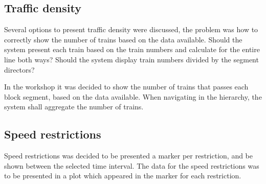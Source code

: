 \subsection{Traffic density} %
\label{sub:traffic_density}
Several options to present traffic density were discussed, the problem was how
to correctly show the number of trains based on the data available. 
Should the system present each train based on the train numbers and 
calculate for the entire line both ways? Should the system display train 
numbers divided by the segment directors? 

In the workshop it was decided to show the number of trains that passes each 
block segment, based on the data available. When navigating in the hierarchy,
the system shall aggregate the number of trains.


\subsection{Speed restrictions} %
\label{sub:speed_restrictions}
Speed restrictions was decided to be presented a marker per restriction, and be
shown between the selected time interval. The data for the speed restrictions
was to be presented in a plot which appeared in the marker for each
restriction.




